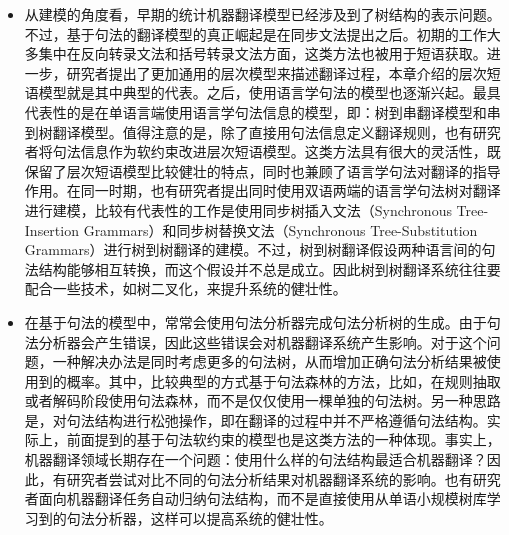 \begin{itemize}
\vspace{0.5em}
\item 从建模的角度看，早期的统计机器翻译模型已经涉及到了树结构的表示问题。不过，基于句法的翻译模型的真正崛起是在同步文法提出之后。初期的工作大多集中在反向转录文法和括号转录文法方面，这类方法也被用于短语获取。进一步，研究者提出了更加通用的层次模型来描述翻译过程，本章介绍的层次短语模型就是其中典型的代表。之后，使用语言学句法的模型也逐渐兴起。最具代表性的是在单语言端使用语言学句法信息的模型，即：树到串翻译模型和串到树翻译模型。值得注意的是，除了直接用句法信息定义翻译规则，也有研究者将句法信息作为软约束改进层次短语模型。这类方法具有很大的灵活性，既保留了层次短语模型比较健壮的特点，同时也兼顾了语言学句法对翻译的指导作用。在同一时期，也有研究者提出同时使用双语两端的语言学句法树对翻译进行建模，比较有代表性的工作是使用同步树插入文法（Synchronous Tree-Insertion Grammars）和同步树替换文法（Synchronous Tree-Substitution Grammars）进行树到树翻译的建模。不过，树到树翻译假设两种语言间的句法结构能够相互转换，而这个假设并不总是成立。因此树到树翻译系统往往要配合一些技术，如树二叉化，来提升系统的健壮性。
\vspace{0.5em}
\item 在基于句法的模型中，常常会使用句法分析器完成句法分析树的生成。由于句法分析器会产生错误，因此这些错误会对机器翻译系统产生影响。对于这个问题，一种解决办法是同时考虑更多的句法树，从而增加正确句法分析结果被使用到的概率。其中，比较典型的方式基于句法森林的方法，比如，在规则抽取或者解码阶段使用句法森林，而不是仅仅使用一棵单独的句法树。另一种思路是，对句法结构进行松弛操作，即在翻译的过程中并不严格遵循句法结构。实际上，前面提到的基于句法软约束的模型也是这类方法的一种体现。事实上，机器翻译领域长期存在一个问题：使用什么样的句法结构最适合机器翻译？因此，有研究者尝试对比不同的句法分析结果对机器翻译系统的影响。也有研究者面向机器翻译任务自动归纳句法结构，而不是直接使用从单语小规模树库学习到的句法分析器，这样可以提高系统的健壮性。

\end{itemize}
